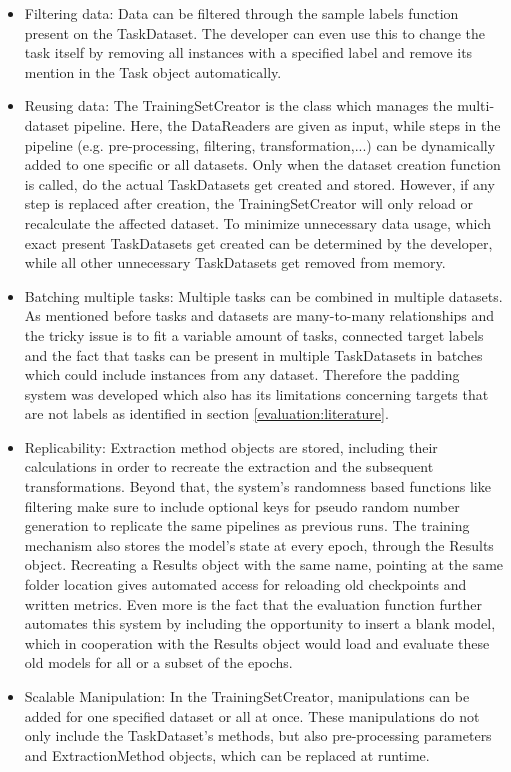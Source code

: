 \begin{itemize}
	\item Filtering data: Data can be filtered through the sample labels function present on the TaskDataset. The developer can even use this to change the task itself by removing all instances with a specified label and remove its mention in the Task object automatically.
	\item Reusing data: The TrainingSetCreator is the class which manages the multi-dataset pipeline. Here, the DataReaders are given as input, while steps in the pipeline (e.g. pre-processing, filtering, transformation,...) can be dynamically added to one specific or all datasets. Only when the dataset creation function is called, do the actual TaskDatasets get created and stored. However, if any step is replaced after creation, the TrainingSetCreator will only reload or recalculate the affected dataset. To minimize unnecessary data usage, which exact present TaskDatasets get created can be determined by the developer, while all other unnecessary TaskDatasets get removed from memory.
	\item Batching multiple tasks: Multiple tasks can be combined in multiple datasets. As mentioned before tasks and datasets are many-to-many relationships and the tricky issue is to fit a variable amount of tasks, connected target labels and the fact that tasks can be present in multiple TaskDatasets in batches which could include instances from any dataset. Therefore the padding system was developed which also has its limitations concerning targets that are not labels as identified in section \ref{evaluation:literature}.
	\item Replicability: Extraction method objects are stored, including their calculations in order to recreate the extraction and the subsequent transformations. Beyond that, the system's randomness based functions like filtering make sure to include optional keys for pseudo random number generation to replicate the same pipelines as previous runs. The training mechanism also stores the model's state at every epoch, through the Results object. Recreating a Results object with the same name, pointing at the same folder location gives automated access for reloading old checkpoints and written metrics. Even more is the fact that the evaluation function further automates this system by including the opportunity to insert a blank model, which in cooperation with the Results object would load and evaluate these old models for all or a subset of the epochs.
	\item Scalable Manipulation: In the TrainingSetCreator, manipulations can be added for one specified dataset or all at once. These manipulations do not only include the TaskDataset's methods, but also pre-processing parameters and ExtractionMethod objects, which can be replaced at runtime.
\end{itemize}
